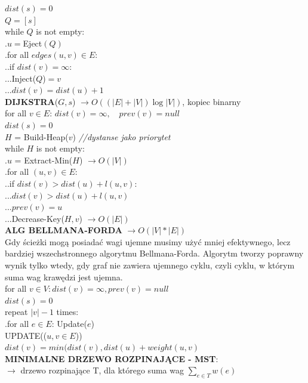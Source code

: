 \documentclass[8pt,a3paper]{article}
\begin{document}
\begin{multicols*}{3}
	 $dist(s) = 0$ \\
	 $Q = [s]$\\
	 while $Q$ is not empty: \\
	 .\quad $u = $Eject$(Q)$\\
	 .\quad for all $edges(u,v) \in E$: \\
	 .\quad .\quad if $dist(v) = \infty$: \\
	 .\quad .\quad .\quad Inject($Q$)$=v$ \\
	 .\quad .\quad .\quad $dist(v) = dist(u) +1$ \\
	 \textbf{DIJKSTRA}($G,s$) $\to O((|E|+|V|)\log |V|)$, kopiec binarny \\
	 for all $v \in E$: $dist(v) = \infty, \quad prev(v) = null$ \\
	 $dist(s) = 0$ \\
	 $H$ = Build-Heap($v$) \quad \textit{//dystanse jako priorytet}\\
	 while $H$ is not empty: \\
	 .\quad $u$ = Extract-Min($H$) {\color{BrickRed}$\to O(|V|)$}\\
	 .\quad for all $(u,v) \in E$: \\
	 .\quad .\quad if $dist(v) > dist(u) + l(u,v) $: \\
	 .\quad .\quad .\quad $dist(v) > dist(u) + l(u,v) $ \\
	 .\quad .\quad .\quad $prev(v) = u $\\
	 .\quad .\quad .\quad Decrease-Key($H,v$) {\color{BrickRed}$\to O(|E|)$}\\
	 \textbf{ALG BELLMANA-FORDA} $\to O(|V|*|E|)$\\
	 Gdy ścieżki mogą posiadać wagi ujemne musimy użyć mniej efektywnego, lecz bardziej wszechstronnego algorytmu Bellmana-Forda. Algorytm tworzy poprawny wynik tylko wtedy, gdy graf nie zawiera ujemnego cyklu, czyli cyklu, w którym suma wag krawędzi jest ujemna. \\
	 for all $v \in V: dist(v) = \infty, prev(v) = null$\\
	 $dist(s) = 0$ \\
	 repeat $|v|-1$ times: \\
	 .\quad for all $e \in E$: Update($e$)\\
	 UPDATE(($u,v \in E$)) \\
	 $dist(v) = min(dist(v), dist(u)+weight(u,v)$\\
	 \textbf{MINIMALNE DRZEWO ROZPINAJĄCE - MST}:\\
	 $\to$ drzewo rozpinające T, dla którego suma wag
	 $\sum_{{e}\in T}w(e)$

\end{multicols*}
\end{document}
